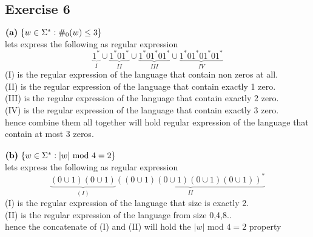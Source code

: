 \documentclass[12pt]{article}
\begin{document}
\subsection*{Exercise 6}
$\text{\textbf{(a)} }\lbrace w \in \Sigma^*: \#_0 (w) \leq 3 \rbrace $\\
lets express the following as regular expression 
\[
 \underbrace{1^*}_{I}\cup \underbrace{1^*01^*}_{II} \cup \underbrace{1^*01^*01^*}_{III}\cup \underbrace{1^*01^*01^*01^*}_{IV} 
\]
(I) is the regular expression of the language that contain non zeros at all.
\\ (II) is the regular expression of the language that contain exactly 1 zero.
\\ (III) is the regular expression of the language that contain exactly 2 zero.
\\ (IV) is the regular expression of the language that contain exactly 3 zero.\\
hence combine them all together will hold regular expression of the language that contain at most 3 zeros.
\\\\$\text{\textbf{(b)} }\lbrace w \in \Sigma^*:|w| \text{ mod 4}=2 \rbrace $\\
lets express the following as regular expression 
\[
 \underbrace{(0 \cup 1 )(0\cup 1) }_{(I)}\underbrace{((0\cup 1)(0\cup 1)(0\cup 1)(0\cup 1))^*}_{II}
\]
(I) is the regular expression of the language that  size is exactly 2. 
\\(II) is the regular expression of the language from size 0,4,8.. \\
hence the concatenate of (I) and (II) will hold the $|w|$ mod $4=2$ property
\end{document}
